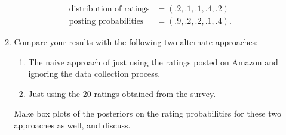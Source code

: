\documentclass[12pt]{article}
\begin{document}
\begin{enumerate}
\begin{enumerate}
\begin{align*}
\text{distribution of ratings} &= (.2, .1, .1, .4, .2) \\
\text{posting probabilities} &= (.9, .2, .2, .1, .4).
\end{align*}
\item Compare your results with the following two alternate approaches:
\begin{enumerate}
\item The naive approach of just using the ratings posted on Amazon and ignoring the data collection process.
\item Just using the 20 ratings obtained from the survey.
\end{enumerate}
Make box plots of the posteriors on the rating probabilities for these two approaches as well, and discuss.
\end{enumerate}


\end{enumerate}
\end{document}
